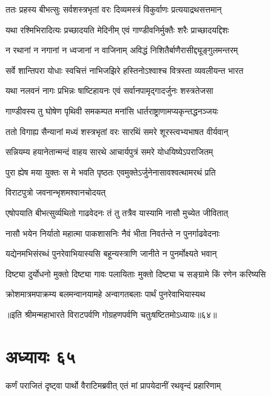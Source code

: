 \twolineshloka
{ततः प्रहस्य बीभत्सुः सर्वशस्त्रभृतां वरः}
{दिव्यमस्त्रं विकुर्वाणः प्रत्ययाद्रथसत्तमान्}


\twolineshloka
{यथा रश्मिभिरादित्यः प्रच्छादयति मेदिनीम्}
{एवं गाण्डीवनिर्मुक्तैः शरैः प्राच्छादयद्दिशः}


\twolineshloka
{न रथानां न नगानां न ध्वजानां न वाजिनाम्}
{अविद्धं निशितैर्बाणैरासीद्द्यूङ्गुलमन्तरम्}


\twolineshloka
{सर्वे शान्तिपरा योधाः स्वचित्तं नाभिजझिरे}
{हस्तिनोऽश्वाश्च वित्रस्ता व्यवलीयन्त भारत}


\twolineshloka
{यथा नलवनं नागः प्रभिन्नः षाष्टिहायनः}
{एवं सर्वानपामृद्गादर्जुनः शस्त्रतेजसा}


\twolineshloka
{गाण्डीवस्य तु घोषेण पृथिवी समकम्पत}
{मनांसि धार्तराष्ट्राणामप्यकृन्तद्धनञ्जयः}


\twolineshloka
{ततो विगाह्य सैन्यानां मध्यं शस्त्रभृतां वरः}
{सारथिं समरे शूरस्त्वभ्यभाषत वीर्यवान्}


\twolineshloka
{सन्नियम्य हयानेतान्मन्दं वाहय सारथे}
{आचार्यपुत्रं समरे योधयिष्येऽपराजितम्}


\twolineshloka
{पुरा ह्येष मया युक्तः स मे भवति पृष्ठतः}
{एवमुक्तेऽर्जुनेनासावश्वत्थामरथं प्रति}


\onelineshloka
{विराटपुत्रो जवनान्भृशमश्वानचोदयत्}




\twolineshloka
{एषोपयाति बीभत्सुर्व्यथितो गाढवेदनः}
{तं तु तत्रैव यास्यामि नासौ मुच्येत जीवितात्}




\twolineshloka
{नासौ भयेन निर्यातो महात्मा पाकशासनिः}
{नैवं भीता निवर्तन्ते न पुनर्गाढवेदनाः}


\twolineshloka
{यद्येनमभिसंरब्धं पुनरेवाभियास्यसि}
{बहून्यस्त्राणि जानीते न पुनर्मोक्ष्यते भवान्}


\twolineshloka
{दिष्ट्या दुर्योधनो मुक्तो दिष्ट्या गावः पलायिताः}
{मुक्तो दिष्ट्या च सङ्ग्रामे किं रणेन करिष्यसि}


\twolineshloka
{क्रोशमात्रमपाक्रम्य बलमन्वानयामहे}
{अन्वागतबलाः पार्थं पुनरेवाभियास्यथ}

॥इति श्रीमन्महाभारते विराटपर्वणि गोग्रहणपर्वणि चतुःषष्टितमोऽध्यायः॥६४॥

\chapter{अध्यायः ६५}

\twolineshloka
{कर्णं पराजितं दृष्ट्वा पार्थो वैराटिमब्रवीत्}
{एतं मां प्रापयेदानीं रथवृन्दं प्रहारिणाम्}


